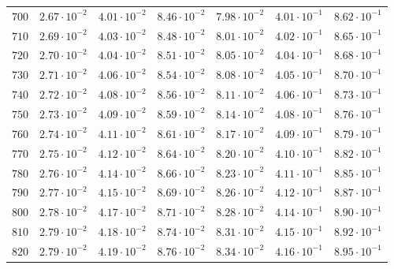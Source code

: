 \begin{table}[h]
\begin{tabular}{lcccccc}
$	700	$ & $	2.67 \cdot 10^{-2}	$ & $	4.01 \cdot 10^{-2}	$ & $	8.46 \cdot 10^{-2}	$ & $	7.98 \cdot 10^{-2}	$ & $	4.01 \cdot 10^{-1}	$ & $	8.62 \cdot 10^{-1}	$ \\
$	710	$ & $	2.69 \cdot 10^{-2}	$ & $	4.03 \cdot 10^{-2}	$ & $	8.48 \cdot 10^{-2}	$ & $	8.01 \cdot 10^{-2}	$ & $	4.02 \cdot 10^{-1}	$ & $	8.65 \cdot 10^{-1}	$ \\
$	720	$ & $	2.70 \cdot 10^{-2}	$ & $	4.04 \cdot 10^{-2}	$ & $	8.51 \cdot 10^{-2}	$ & $	8.05 \cdot 10^{-2}	$ & $	4.04 \cdot 10^{-1}	$ & $	8.68 \cdot 10^{-1}	$ \\
$	730	$ & $	2.71 \cdot 10^{-2}	$ & $	4.06 \cdot 10^{-2}	$ & $	8.54 \cdot 10^{-2}	$ & $	8.08 \cdot 10^{-2}	$ & $	4.05 \cdot 10^{-1}	$ & $	8.70 \cdot 10^{-1}	$ \\
$	740	$ & $	2.72 \cdot 10^{-2}	$ & $	4.08 \cdot 10^{-2}	$ & $	8.56 \cdot 10^{-2}	$ & $	8.11 \cdot 10^{-2}	$ & $	4.06 \cdot 10^{-1}	$ & $	8.73 \cdot 10^{-1}	$ \\
$	750	$ & $	2.73 \cdot 10^{-2}	$ & $	4.09 \cdot 10^{-2}	$ & $	8.59 \cdot 10^{-2}	$ & $	8.14 \cdot 10^{-2}	$ & $	4.08 \cdot 10^{-1}	$ & $	8.76 \cdot 10^{-1}	$ \\
$	760	$ & $	2.74 \cdot 10^{-2}	$ & $	4.11 \cdot 10^{-2}	$ & $	8.61 \cdot 10^{-2}	$ & $	8.17 \cdot 10^{-2}	$ & $	4.09 \cdot 10^{-1}	$ & $	8.79 \cdot 10^{-1}	$ \\
$	770	$ & $	2.75 \cdot 10^{-2}	$ & $	4.12 \cdot 10^{-2}	$ & $	8.64 \cdot 10^{-2}	$ & $	8.20 \cdot 10^{-2}	$ & $	4.10 \cdot 10^{-1}	$ & $	8.82 \cdot 10^{-1}	$ \\
$	780	$ & $	2.76 \cdot 10^{-2}	$ & $	4.14 \cdot 10^{-2}	$ & $	8.66 \cdot 10^{-2}	$ & $	8.23 \cdot 10^{-2}	$ & $	4.11 \cdot 10^{-1}	$ & $	8.85 \cdot 10^{-1}	$ \\
$	790	$ & $	2.77 \cdot 10^{-2}	$ & $	4.15 \cdot 10^{-2}	$ & $	8.69 \cdot 10^{-2}	$ & $	8.26 \cdot 10^{-2}	$ & $	4.12 \cdot 10^{-1}	$ & $	8.87 \cdot 10^{-1}	$ \\
$	800	$ & $	2.78 \cdot 10^{-2}	$ & $	4.17 \cdot 10^{-2}	$ & $	8.71 \cdot 10^{-2}	$ & $	8.28 \cdot 10^{-2}	$ & $	4.14 \cdot 10^{-1}	$ & $	8.90 \cdot 10^{-1}	$ \\
$	810	$ & $	2.79 \cdot 10^{-2}	$ & $	4.18 \cdot 10^{-2}	$ & $	8.74 \cdot 10^{-2}	$ & $	8.31 \cdot 10^{-2}	$ & $	4.15 \cdot 10^{-1}	$ & $	8.92 \cdot 10^{-1}	$ \\
$	820	$ & $	2.79 \cdot 10^{-2}	$ & $	4.19 \cdot 10^{-2}	$ & $	8.76 \cdot 10^{-2}	$ & $	8.34 \cdot 10^{-2}	$ & $	4.16 \cdot 10^{-1}	$ & $	8.95 \cdot 10^{-1}	$ \\

\end{tabular}
\end{table}
